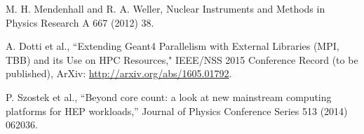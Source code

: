 \documentclass[final,5p,times,longtitle,twocolumn]{elsarticle}
\begin{document}
\begin{thebibliography}{00}
 M. H. Mendenhall and R. A. Weller,
                     Nuclear Instruments and Methods in Physics Research A
                     667 (2012) 38.










 A. Dotti et al., ``Extending Geant4 Parallelism with External
                    Libraries (MPI, TBB) and its Use on HPC Resources," IEEE/NSS 2015
                    Conference Record (to be published),
                    ArXiv: \url{http://arxiv.org/abs/1605.01792}. 

 P. Szostek et al., ``Beyond core count: a look at new mainstream 
                  computing platforms for HEP workloads,''
                  Journal of Physics Conference Series 513 (2014) 062036. 

\end{thebibliography}

\end{document}
